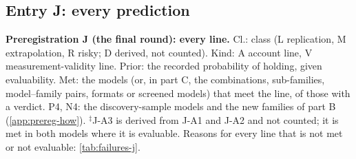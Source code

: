 \subsection{Entry J: every prediction}\label{app:prereg-j}

\begin{table}[!ht]
\centering
\caption{\textbf{Preregistration J (the final round): every line.} Cl.: class (L replication, M extrapolation, R risky; D derived, not counted). Kind: A account line, V measurement-validity line. Prior: the recorded probability of holding, given evaluability. Met: the models (or, in part C, the combinations, sub-families, model--family pairs, formats or screened models) that meet the line, of those with a verdict. P4, N4: the discovery-sample models and the new families of part B (\cref{app:prereg-how}). $^\ddagger$J-A3 is derived from J-A1 and J-A2 and not counted; it is met in both models where it is evaluable. Reasons for every line that is not met or not evaluable: \cref{tab:failures-j}.}
\label{tab:prereg-j}
\scalebox{0.86}{\begin{minipage}{\textwidth}\centering\end{minipage}}
\end{table}

